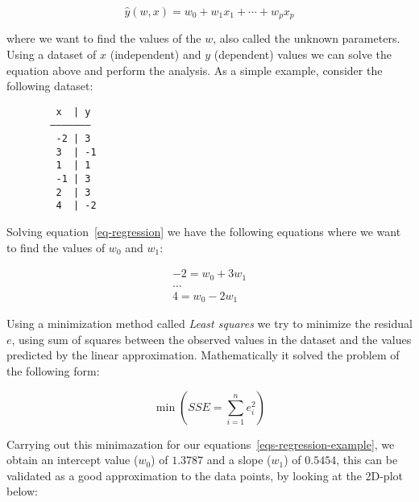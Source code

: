 \begin{equation}
  \label{eq-regression}
  \hat{y}(w,x) = w_0 + w_1 x_1 + \cdots + w_p x_p
\end{equation}

where we want to find the values of the $w$, also called the unknown
parameters. Using a dataset of $x$ (independent) and $y$ (dependent) values we
can solve the equation above and perform the analysis. As a simple example,
consider the following dataset:

\begin{figure}[H]
  \centering
  \begin{BVerbatim}
   x  | y  
  ———————
   -2 | 3
   3  | -1
   1  | 1
   -1 | 3
   2  | 3
   4  | -2
  \end{BVerbatim}
\end{figure}

Solving equation~\ref{eq-regression} we have the following equations where we
want to find the values of $w_0$ and $w_1$:

\begin{equation}
  \label{eqs-regression-example}
  \begin{split}
    -2 = w_0 + 3 w_1 \\
    \dots \\
    4 = w_0 - 2 w_1
  \end{split}
\end{equation}

Using a minimization method called \textit{Least squares} we try to minimize
the residual $e$, using sum of squares between the observed values in the
dataset and the values predicted by the linear approximation. Mathematically it
solved the problem of the following form:

\begin{equation}
  \min (SSE = \sum_{i=1}^{n} e_i^2)
\end{equation}

Carrying out this minimazation for our equations~\ref{eqs-regression-example},
we obtain an intercept value ($w_0$) of $1.3787$ and a slope ($w_1$) of
$0.5454$, this can be validated as a good approximation to the data points, by
looking at the 2D-plot below:

\begin{figure}[H]
  \centering
\end{figure}

